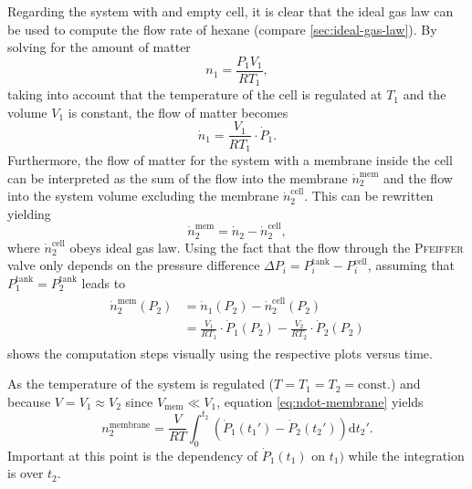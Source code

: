 \documentclass[../thesis.tex]{subfiles}
\begin{document}
          Regarding the system with and empty cell, it is clear that the ideal gas law can be used to compute the flow rate of hexane (compare \cref{sec:ideal-gas-law}). By solving for the amount of matter
          \begin{equation*}
              n_1 = \frac{P_1V_1}{RT_1},
          \end{equation*}
          taking into account that the temperature of the cell is regulated at $T_1$ and the volume $V_1$ is constant, the flow of matter becomes
          \begin{equation*}
              \dot{n}_1 = \frac{V_1}{RT_1}\cdot \dot{P}_1.
              \label{eq:n1}
          \end{equation*}
          Furthermore, the flow of matter for the system with a membrane inside the cell can be interpreted as the sum of the flow into the membrane $\dot{n}_2^\mathrm{mem}$ and the flow into the system volume excluding the membrane $\dot{n}_2^\mathrm{cell}$. This can be rewritten yielding
          \begin{equation*}
              \dot{n}_2^\mathrm{mem} = \dot{n}_2 - \dot{n}_2^\mathrm{cell},
          \end{equation*}
          where $\dot{n}^\mathrm{cell}_2$ obeys ideal gas law. Using the fact that the flow through the \textsc{Pfeiffer} valve only depends on the pressure difference $\Delta P_i = P_i^\mathrm{tank} - P_i^\mathrm{cell}$, assuming that $P_1^\mathrm{tank} = P_2^\mathrm{tank}$ leads to
          \begin{align}
              \begin{split}
                  \dot{n}_2^\mathrm{mem}(P_2) &= \dot{n}_1(P_2) - \dot{n}_2^\mathrm{cell}(P_2)\\
                  &=\frac{V_1}{RT_1}\cdot \dot{P}_1(P_2) - \frac{V_2}{RT_2}\cdot \dot{P}_2(P_2)
              \end{split}
              \label{eq:ndot-membrane}
          \end{align}
           shows the computation steps visually using the respective plots versus time.

          

          As the temperature of the system is regulated ($T = T_1 = T_2 = \mathrm{const.}$) and because $V = V_1 \approx V_2$ since $V_\mathrm{mem} \ll V_1$, equation \cref{eq:ndot-membrane} yields
          \begin{equation}
              n_2^\mathrm{membrane} = \frac{V}{RT}\int_0^{t_2}\left(\dot{P}_1(t_1') - \dot{P}_2(t_2')\right) \mathrm{d}t_2'.
              \label{eq:nmembrane-1}
          \end{equation}
          Important at this point is the dependency of $\dot{P}_1(t_1)$ on $t_1)$ while the integration is over $t_2$.
\end{document}
